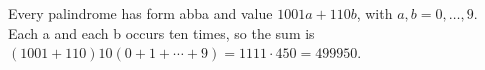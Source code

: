 Every palindrome has form abba and value $1001a+110b$, with $a,b=0,\ldots,9$. Each a and each b occurs ten times, so the sum is $(1001+110)10(0+1+\cdots+9)=1111\cdot450=\boxed{499950}$.
